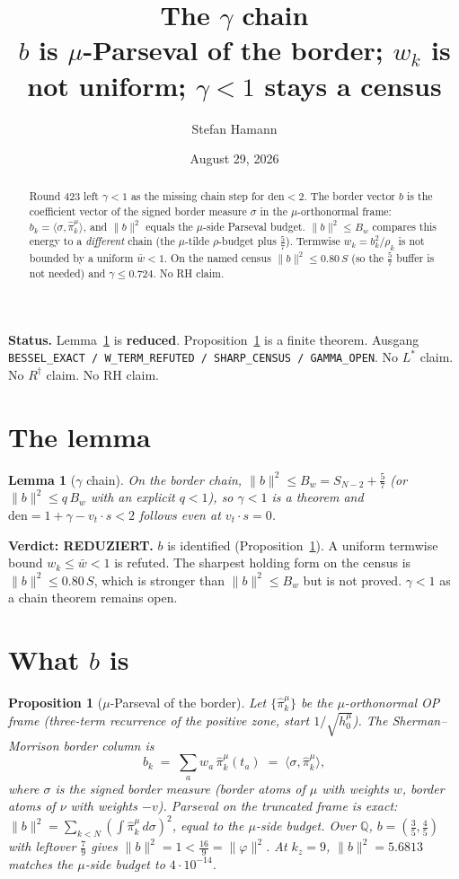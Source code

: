 \documentclass[11pt]{article}
\title{\bfseries The $\gamma$ chain\\[2mm]
\large $b$ is $\mu$-Parseval of the border;
$w_k$ is not uniform; $\gamma<1$ stays a census}
\author{Stefan Hamann}
\date{August 29, 2026}
\newtheorem{lemma}{Lemma}
\newtheorem{prop}{Proposition}
\theoremstyle{remark}
\begin{document}
\maketitle

\begin{abstract}\noindent
Round 423 left $\gamma<1$ as the missing chain
step for $\mathrm{den}<2$.
The border vector $b$ is the coefficient vector
of the signed border measure $\sigma$ in the
$\mu$-orthonormal frame:
$b_k=\langle\sigma,\hat\pi_k^\mu\rangle$,
and $\|b\|^2$ equals the $\mu$-side Parseval
budget.
$\|b\|^2\le B_w$ compares this energy to a
\emph{different} chain (the $\mu$-tilde
$\rho$-budget plus $\tfrac57$).
Termwise $w_k=b_k^2/\rho_k$ is not bounded by
a uniform $\bar w<1$.
On the named census $\|b\|^2\le 0.80\,S$
(so the $\tfrac57$ buffer is not needed)
and $\gamma\le 0.724$.
No RH claim.
\end{abstract}

\medskip\noindent
\textbf{Status.}\enspace
Lemma~\ref{lem:gamma} is \textbf{reduced}.
Proposition~\ref{prop:bessel} is a finite theorem.
Ausgang \texttt{BESSEL\_EXACT / W\_TERM\_REFUTED / SHARP\_CENSUS / GAMMA\_OPEN}.
No $L^{*}$ claim.  No $R^{\dagger}$ claim.  No RH claim.

\section{The lemma}\label{sec:lem}

\begin{lemma}[$\gamma$ chain]\label{lem:gamma}
On the border chain,
$\|b\|^2\le B_w=S_{N-2}+\tfrac57$
(or $\|b\|^2\le q\,B_w$ with an explicit $q<1$),
so $\gamma<1$ is a theorem and
$\mathrm{den}=1+\gamma-v_t\cdot s<2$
follows even at $v_t\cdot s=0$.
\end{lemma}

\noindent
\textbf{Verdict: REDUZIERT.}
$b$ is identified (Proposition~\ref{prop:bessel}).
A uniform termwise bound $w_k\le\bar w<1$ is
refuted.
The sharpest holding form on the census is
$\|b\|^2\le 0.80\,S$, which is stronger than
$\|b\|^2\le B_w$ but is not proved.
$\gamma<1$ as a chain theorem remains open.

\section{What $b$ is}\label{sec:b}

\begin{prop}[$\mu$-Parseval of the border]\label{prop:bessel}
Let $\{\hat\pi_k^\mu\}$ be the $\mu$-orthonormal
OP frame (three-term recurrence of the positive
zone, start $1/\sqrt{h_0^\mu}$).
The Sherman--Morrison border column is
\[
  b_k
  \;=\;
  \sum_a w_a\,\hat\pi_k^\mu(t_a)
  \;=\;
  \langle\sigma,\hat\pi_k^\mu\rangle,
\]
where $\sigma$ is the signed border measure
(border atoms of $\mu$ with weights $w$,
border atoms of $\nu$ with weights $-v$).
Parseval on the truncated frame is exact:
$\|b\|^2=\sum_{k<N}(\int\hat\pi_k^\mu\,d\sigma)^2$,
equal to the $\mu$-side budget.
Over $\mathbb{Q}$,
$b=(\tfrac35,\tfrac45)$ with leftover
$\tfrac79$ gives
$\|b\|^2=1<\tfrac{16}{9}=\|\varphi\|^2$.
At $k_z=9$,
$\|b\|^2=5.6813$ matches the $\mu$-side
budget to $4\cdot10^{-14}$.
\end{prop}
\end{document}
